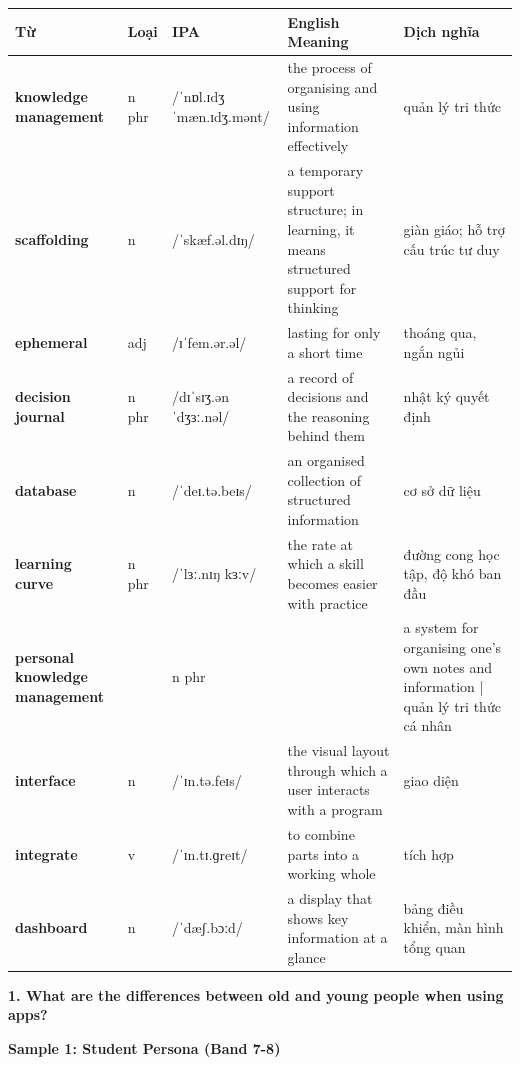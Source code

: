 \vspace{0.8em}
\begin{center}
\renewcommand{\arraystretch}{1.65}
\begin{tabularx}{\textwidth}{|V{0.22\textwidth}|C{0.07\textwidth}|I{0.20\textwidth}|Y|V{0.18\textwidth}|}
\hline
{}
\textbf{Từ} & \textbf{Loại} & \textbf{IPA} & \textbf{English Meaning} & \textbf{Dịch nghĩa} \\
\hline
\textbf{knowledge management} & n phr & /ˈnɒl.ɪdʒ ˈmæn.ɪdʒ.mənt/ & the process of organising and using information effectively & quản lý tri thức \\ \hline
\textbf{scaffolding} & n & /ˈskæf.əl.dɪŋ/ & a temporary support structure; in learning, it means structured support for thinking & giàn giáo; hỗ trợ cấu trúc tư duy \\ \hline
\textbf{ephemeral} & adj & /ɪˈfem.ər.əl/ & lasting for only a short time & thoáng qua, ngắn ngủi \\ \hline
\textbf{decision journal} & n phr & /dɪˈsɪʒ.ən ˈdʒɜː.nəl/ & a record of decisions and the reasoning behind them & nhật ký quyết định \\ \hline
\textbf{database} & n & /ˈdeɪ.tə.beɪs/ & an organised collection of structured information & cơ sở dữ liệu \\ \hline
\textbf{learning curve} & n phr & /ˈlɜː.nɪŋ kɜːv/ & the rate at which a skill becomes easier with practice & đường cong học tập, độ khó ban đầu \\ \hline
\textbf{personal knowledge management} & & n phr & & a system for organising one's own notes and information | quản lý tri thức cá nhân \\ \hline
\textbf{interface} & n & /ˈɪn.tə.feɪs/ & the visual layout through which a user interacts with a program & giao diện \\ \hline
\textbf{integrate} & v & /ˈɪn.tɪ.ɡreɪt/ & to combine parts into a working whole & tích hợp \\ \hline
\textbf{dashboard} & n & /ˈdæʃ.bɔːd/ & a display that shows key information at a glance & bảng điều khiển, màn hình tổng quan \\ \hline
\end{tabularx}
\end{center}

\partthreeheader

\begin{ieltsquestion}
\textbf{1. What are the differences between old and young people when using apps?}
\end{ieltsquestion}
\textbf{Sample 1: Student Persona (Band 7-8)}

